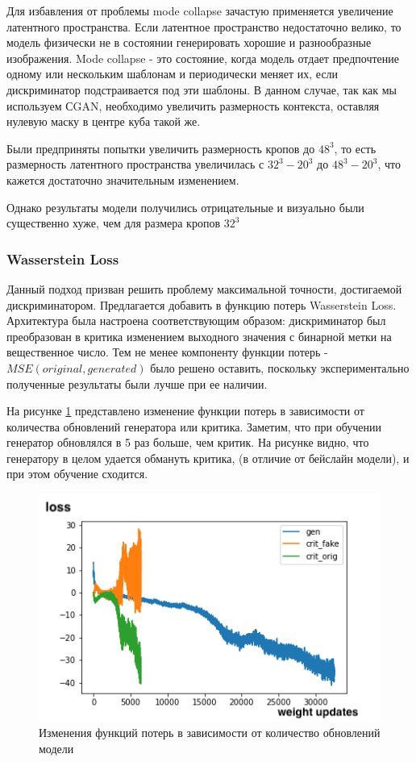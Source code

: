 Для избавления от проблемы mode collapse зачастую применяется увеличение латентного пространства. Если латентное пространство недостаточно велико, то модель физически не в состоянии генерировать хорошие и разнообразные изображения. Mode collapse - это состояние, когда модель отдает предпочтение одному или нескольким шаблонам и периодически меняет их, если дискриминатор подстраивается под эти шаблоны. В данном случае, так как мы используем СGAN, необходимо увеличить размерность контекста, оставляя нулевую маску в центре куба такой же.

Были предприняты попытки увеличить размерность кропов до $48^3$, то есть размерность латентного пространства увеличилась с $32^3 - 20^3$ до $48^3 - 20^3$, что кажется достаточно значительным изменением.

Однако результаты модели получились отрицательные и визуально были существенно хуже, чем для размера кропов $32^3$

\subsubsection{Wasserstein Loss}

Данный подход призван решить проблему максимальной точности, достигаемой дискриминатором. Предлагается добавить в функцию потерь Wasserstein Loss. Архитектура была настроена соответствующим образом: дискриминатор был преобразован в критика изменением выходного значения с бинарной метки на вещественное число. Тем не менее компоненту функции потерь - $MSE(original, generated)$ было решено оставить, поскольку экспериментально полученные результаты были лучше при ее наличии.

На рисунке \ref{loss} представлено изменение функции потерь в зависимости от количества обновлений генератора или критика. Заметим, что при обучении генератор обновлялся в 5 раз больше, чем критик. На рисунке видно, что генератору в целом удается обмануть критика, (в отличие от бейслайн модели), и при этом обучение сходится.

\begin{figure}[!h]
\includegraphics[width=\linewidth]{images/final-gan-loss.png}
\caption{Изменения функций потерь в зависимости от количество обновлений модели}\label{loss}
\centering
\end{figure}


